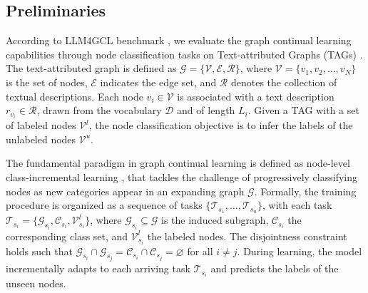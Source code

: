 \documentclass[sigconf]{acmart}
\begin{document}
\subsection{Preliminaries}
According to LLM4GCL benchmark \cite{SimGCL}, we evaluate the graph continual learning capabilities through node classification tasks on Text-attributed Graphs (TAGs) \cite{TAG}.
The text-attributed graph is defined as $\mathcal{G = \{V, E, R\}}$, where $\mathcal{V} = \{v_1, v_2, \ldots, v_N\}$ is the set of nodes, $\mathcal{E}$ indicates the edge set, and $\mathcal{R}$ denotes the collection of textual descriptions. 
Each node $v_i \in \mathcal{V}$ is associated with a text description $r_{v_i} \in \mathcal{R}$, drawn from the vocabulary $\mathcal{D}$ and of length $L_i$. 
Given a TAG with a set of labeled nodes $\mathcal{V}^l$, the node classification objective is to infer the labels of the unlabeled nodes $\mathcal{V}^u$.

The fundamental paradigm in graph continual learning is defined as node-level class-incremental learning \cite{SimGCL}, that tackles the challenge of progressively classifying nodes as new categories appear in an expanding graph $\mathcal{G}$.
Formally, the training procedure is organized as a sequence of tasks $\{\mathcal{T}_{s_1}, \ldots, \mathcal{T}_{s_n}\}$, with each task $\mathcal{T}_{s_i} = \{\mathcal{G}_{s_i}, \mathcal{C}_{s_i}, \mathcal{V}^l_{s_i}\}$, where $\mathcal{G}_{s_i} \subseteq \mathcal{G}$ is the induced subgraph, $\mathcal{C}_{s_i}$ the corresponding class set, and $\mathcal{V}^l_{s_i}$ the labeled nodes. 
The disjointness constraint holds such that $\mathcal{G}_{s_i} \cap \mathcal{G}_{s_j} = \mathcal{C}_{s_i} \cap \mathcal{C}_{s_j} = \varnothing$ for all $i \neq j$. 
During learning, the model incrementally adapts to each arriving task $\mathcal{T}_{s_i}$ and predicts the labels of the unseen nodes.
\end{document}
